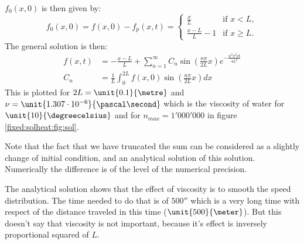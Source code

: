$f_{0}(x,0)$ is then given by:
\begin{equation}
  f_{0}(x,0)=f(x,0)-f_{p}(x,t)=\begin{cases}
                               	\frac{x}{L}&\text{if $x<L$},\\
                               	\frac{x-L}{L}-1&\text{if $x\geq L$.}
                               \end{cases}
\end{equation}
The general solution is then:
\begin{align}
  f(x,t)&=-\frac{x-L}{L}+\sum_{n=1}^{\infty}C_{n}\sin\left(\frac{n\pi}{2L}x\right)e^{-\frac{n^2\pi^2\nu t}{4L^2}}\\
  C_{n}&=\frac{1}{L}\int_{0}^{2L}f(x,0)\sin\left(\frac{n\pi}{2L}x\right) dx
\end{align}
This is plotted for $2L=\unit{0.1}{\metre}$ and $\nu=\unit{1.307\cdot 10^{-6}}{\pascal\second}$ which is the viscosity of water for $\unit{10}{\degreecelsius}$ and for $n_{max}=1'000'000$ in figure \ref{fixed:solheat:fig:sol}.

Note that the fact that we have truncated the sum can be considered as a slightly change of initial condition, and an analytical solution of this solution.
Numerically the difference is of the level of the numerical precision.

The analytical solution shows that the effect of viscosity is to smooth the speed distribution. The time needed to do that is of $\unit{500}{\second}$
which is a very long time with respect of the distance traveled in this time ($\unit{500}{\meter}$).
But this doesn't say that viscosity is not important, because it's effect is inversely proportional squared of $L$.

\HeatSolaa

\HeatSola

\HeatSolb

\HeatSolc

\HeatSold

\HeatSole

